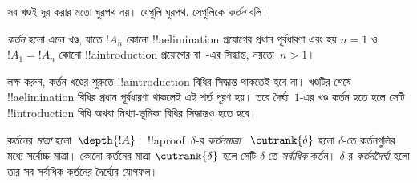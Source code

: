 \documentclass[../../../include/open-logic-section]{subfiles}
\begin{document}
সব খণ্ডই দূর করার মতো ঘুরপথ নয়।
যেগুলি ঘুরপথ, সেগুলিকে \emph{কর্তন} বলি।

\begin{defn}
\emph{কর্তন} হলো এমন খণ্ড, যাতে $!A_n$
কোনো !!a{elimination} প্রয়োগের প্রধান পূর্বধারণা
এবং হয় $n=1$ ও $!A_1 = !A_n$ কোনো
!!a{introduction} প্রয়োগের বা~\FalseInt-এর
সিদ্ধান্ত, নয়তো~$n>1$।
\end{defn}

লক্ষ করুন, কর্তন-খণ্ডের শুরুতে
!!a{introduction} বিধির সিদ্ধান্ত থাকতেই হবে না।
খণ্ডটির শেষে !!a{elimination} বিধির
প্রধান পূর্বধারণা থাকলেই এই শর্ত পূরণ হয়।
তবে দৈর্ঘ্য~$1$-এর খণ্ড কর্তন হতে হলে
সেটি !!{introduction} বিধি অথবা
মিথ্যা-ভূমিকা বিধির সিদ্ধান্তও হতে হবে।

\begin{defn}
কর্তনের \emph{মাত্রা} হলো~$\depth{!A}$।
!!a{proof}~$\delta$-র \emph{কর্তনমাত্রা}
~$\cutrank{\delta}$ হলো $\delta$-তে
কর্তনগুলির মধ্যে সর্বোচ্চ মাত্রা।
কোনো কর্তনের মাত্রা $\cutrank{\delta}$
হলে সেটি $\delta$-তে \emph{সর্বাধিক}
কর্তন। $\delta$-র \emph{কর্তনদৈর্ঘ্য}
হলো তার সব সর্বাধিক কর্তনের দৈর্ঘ্যের যোগফল।
\end{defn}
\end{document}
